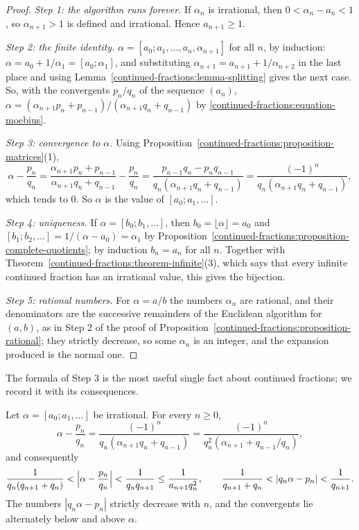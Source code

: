 \begin{proof}
\emph{Step 1: the algorithm runs forever.} If $\alpha_n$ is irrational, then $0 < \alpha_n - a_n < 1$, so $\alpha_{n+1} > 1$ is defined and irrational. Hence $a_{n+1} \geq 1$.

\emph{Step 2: the finite identity.} $\alpha = [a_0; a_1, \ldots, a_n, \alpha_{n+1}]$ for all $n$, by induction: $\alpha = a_0 + 1/\alpha_1 = [a_0; \alpha_1]$, and substituting
$\alpha_{n+1} = a_{n+1} + 1/\alpha_{n+2}$ in the last place and using Lemma~\ref{continued-fractions:lemma-splitting} gives the next case. So, with the convergents $p_n/q_n$ of the
sequence $(a_n)$, $\alpha = (\alpha_{n+1}p_n + p_{n-1})/(\alpha_{n+1}q_n + q_{n-1})$ by \eqref{continued-fractions:equation-moebius}.

\emph{Step 3: convergence to $\alpha$.} Using Proposition~\ref{continued-fractions:proposition-matrices}(1),
\[
\alpha - \frac{p_n}{q_n} = \frac{\alpha_{n+1}p_n + p_{n-1}}{\alpha_{n+1}q_n + q_{n-1}} - \frac{p_n}{q_n} = \frac{p_{n-1}q_n - p_nq_{n-1}}{q_n(\alpha_{n+1}q_n + q_{n-1})}
= \frac{(-1)^n}{q_n(\alpha_{n+1}q_n + q_{n-1})},
\]
which tends to $0$. So $\alpha$ is the value of $[a_0; a_1, \ldots]$.

\emph{Step 4: uniqueness.} If $\alpha = [b_0; b_1, \ldots]$, then $b_0 = \lfloor \alpha \rfloor = a_0$ and $[b_1; b_2, \ldots] = 1/(\alpha - a_0) = \alpha_1$ by
Proposition~\ref{continued-fractions:proposition-complete-quotients}; by induction $b_n = a_n$ for all $n$. Together with Theorem~\ref{continued-fractions:theorem-infinite}(3), which says that every
infinite continued fraction has an irrational value, this gives the bijection.

\emph{Step 5: rational numbers.} For $\alpha = a/b$ the numbers $\alpha_n$ are rational, and their denominators are the successive remainders of the Euclidean algorithm for $(a, b)$, as in Step 2 of
the proof of Proposition~\ref{continued-fractions:proposition-rational}; they strictly decrease, so some $\alpha_n$ is an integer, and the expansion produced is the normal one.
\end{proof}

The formula of Step 3 is the most useful single fact about continued fractions; we record it with its consequences.

\begin{corollary}\label{continued-fractions:corollary-error}
Let $\alpha = [a_0; a_1, \ldots]$ be irrational. For every $n \geq 0$,
\begin{equation}\label{continued-fractions:equation-error}
\alpha - \frac{p_n}{q_n} = \frac{(-1)^n}{q_n(\alpha_{n+1}q_n + q_{n-1})} = \frac{(-1)^n}{q_n^2(\alpha_{n+1} + q_{n-1}/q_n)},
\end{equation}
and consequently
\[
\frac{1}{q_n(q_{n+1} + q_n)} < \Bigl|\alpha - \frac{p_n}{q_n}\Bigr| < \frac{1}{q_nq_{n+1}} \leq \frac{1}{a_{n+1}q_n^2}, \qquad \frac{1}{q_{n+1} + q_n} < |q_n\alpha - p_n| < \frac{1}{q_{n+1}}.
\]
The numbers $|q_n\alpha - p_n|$ strictly decrease with $n$, and the convergents lie alternately below and above $\alpha$.
\end{corollary}

